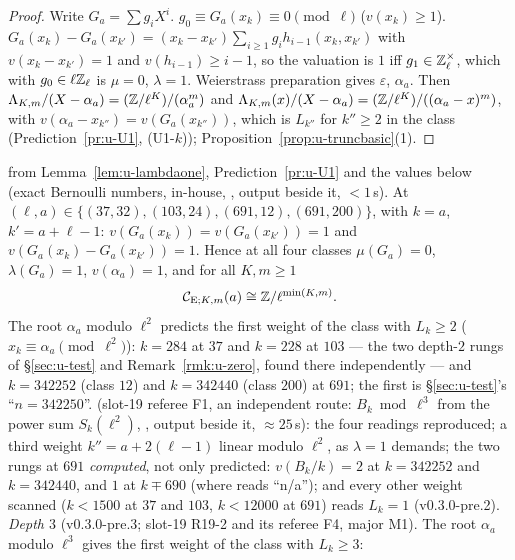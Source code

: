 \documentclass[11pt]{article}
\newcommand{\Iw}{\Lambda}                         %
\newcommand{\Eis}{\mathrm{E}}
\newcommand{\Cg}{\mathcal{C}}                     %
\newcommand{\Zl}{\Z_\ell}
\begin{document}
\begin{proof}
Write $G_a=\sum g_iX^{i}$. $g_0\equiv G_a(x_k)\equiv0\pmod\ell$ ($v(x_k)\ge1$). $G_a(x_k)-G_a(x_{k'})=(x_k-x_{k'})\sum_{i\ge1}g_ih_{i-1}(x_k,x_{k'})$ with
$v(x_k-x_{k'})=1$ and $v(h_{i-1})\ge i-1$, so the valuation is $1$ iff $g_1\in\Zl^{\times}$, which with $g_0\in\ell\Zl$ is $\mu=0$, $\lambda=1$. Weierstrass
preparation gives $\varepsilon$, $\alpha_a$. Then $\Iw_{K,m}/(X-\alpha_a)=(\Z/\ell^{K})/(\alpha_a^{m})$ and $\Iw_{K,m}(x)/(X-\alpha_a)=(\Z/\ell^{K})/((\alpha_a-x)^{m})$, with
$v(\alpha_a-x_{k''})=v(G_a(x_{k''}))$, which is $L_{k''}$ for $k''\ge2$ in the class (Prediction~\ref{pr:u-U1}, (U1-$k$)); Proposition~\ref{prop:u-truncbasic}(1).
\end{proof}

\begin{proposition}\label{prop:u-eistrunc}
\PROVED{} from Lemma~\ref{lem:u-lambdaone}, Prediction~\ref{pr:u-U1} and the \COMP{} values below (exact Bernoulli numbers, in-house,
, output  beside it, $<1$\,s). At $(\ell,a)\in\{(37,32),(103,24),(691,12),(691,200)\}$,
with $k=a$, $k'=a+\ell-1$: $v(G_a(x_k))=v(G_a(x_{k'}))=1$ and $v(G_a(x_k)-G_a(x_{k'}))=1$. Hence at all four classes $\mu(G_a)=0$, $\lambda(G_a)=1$,
$v(\alpha_a)=1$, and for all $K,m\ge1$
\[
  \Cg_{\Eis;K,m}(a)\cong\Z/\ell^{\min(K,m)}.
\]
The root $\alpha_a$ modulo $\ell^{2}$ predicts the first weight of the class with $L_k\ge2$ ($x_k\equiv\alpha_a\pmod{\ell^{2}}$): $k=284$ at $37$ and $k=228$ at
$103$ --- the two depth-$2$ rungs of \S\ref{sec:u-test} and Remark~\ref{rmk:u-zero}, found there independently --- and $k=342252$ (class $12$) and $k=342440$
(class $200$) at $691$; the first is \S\ref{sec:u-test}'s ``$n=342250$''. \COMP{} (slot-19 referee F1, an independent route: $B_k\bmod\ell^{3}$ from the power sum
$S_k(\ell^{2})$, , output  beside it, $\approx25$\,s): the four readings reproduced; a third
weight $k''=a+2(\ell-1)$ linear modulo $\ell^{2}$, as $\lambda=1$ demands; the two rungs at $691$ \emph{computed}, not only predicted:
$v(B_k/k)=2$ at $k=342252$ and $k=342440$, and $1$ at $k\mp690$ (where  reads ``n/a''); and every other weight scanned ($k<1500$ at $37$ and $103$,
$k<12000$ at $691$) reads $L_k=1$ (v0.3.0-pre.2).
\emph{Depth $3$} (v0.3.0-pre.3; slot-19 R19-2 and its referee F4, major M1). The root $\alpha_a$ modulo $\ell^{3}$ gives the first weight of the class with $L_k\ge3$:

\end{proposition}
\end{document}
